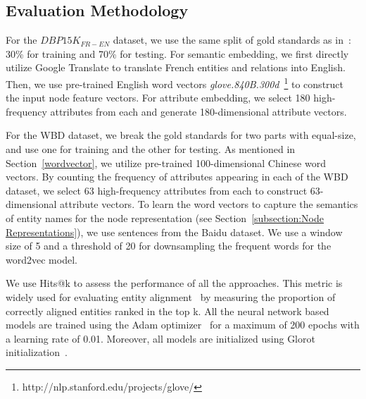 	
	



	\subsection{Evaluation Methodology}
    	For the $DBP15K_{FR-EN}$ dataset, we use the same split of gold standards as in~\cite{sun2017cross}: 30\% for training and 70\% for
    testing.
	For semantic embedding, we first directly utilize Google Translate to translate French entities and relations into English.
	Then, we use pre-trained English word vectors \emph{glove.840B.300d}~\footnote{http://nlp.stanford.edu/projects/glove/} to construct the input node feature vectors.
	For attribute embedding, we select 180 high-frequency attributes from each \KG and generate 180-dimensional attribute vectors.	


	For the WBD dataset, we break the gold standards for two parts with equal-size, and use one for training and the other for testing.
	As mentioned in Section~\ref{wordvector}, we utilize pre-trained 100-dimensional Chinese word vectors.
	By counting the frequency of attributes appearing in each \KG of the WBD dataset, we select 63 high-frequency attributes from each \KG to construct 63-dimensional attribute vectors.
     To learn the word vectors to capture the semantics of entity names for the node representation (see Section~\ref{subsection:Node
    Representations}), we use sentences from  the Baidu dataset. We use a window size of 5 and a threshold of 20 for downsampling the frequent words
    for the word2vec model.
	

	
	We use Hits@k to assess the performance of all the approaches.
	This metric is widely used for evaluating entity alignment~\cite{hao2016joint,chen2016multilingual,sun2017cross,zhu2017iterative} by measuring the proportion of correctly aligned entities ranked in the top k.
	All the neural network based models are trained using the Adam optimizer~\cite{Kingma2014Adam} for a maximum of 200 epochs with a learning rate
    of 0.01.  Moreover, all models are initialized using Glorot initialization~\cite{Glorot2010Understanding}.
	
